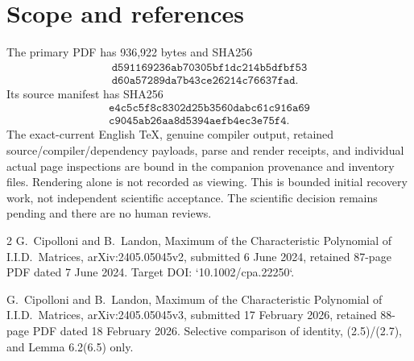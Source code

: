 \documentclass[10pt]{article}
\begin{document}
\section*{Scope and references}
The primary PDF has 936,922 bytes and SHA256 \[\begin{gathered}
\texttt{d591169236ab70305bf1dc214b5dfbf53}\\
\texttt{d60a57289da7b43ce26214c76637fad}.
\end{gathered}\] Its source manifest has SHA256 \[\begin{gathered}
\texttt{e4c5c5f8c8302d25b3560dabc61c916a69}\\
\texttt{c9045ab26aa8d5394aefb4ec3e75f4}.
\end{gathered}\] The exact-current English TeX, genuine compiler output, retained source/compiler/dependency payloads, parse and render receipts, and individual actual page inspections are bound in the companion provenance and inventory files. Rendering alone is not recorded as viewing. This is bounded initial recovery work, not independent scientific acceptance. The scientific decision remains pending and there are no human reviews.\par
2 G. Cipolloni and B. Landon, Maximum of the Characteristic Polynomial of I.I.D. Matrices, arXiv:2405.05045v2, submitted 6 June 2024, retained 87-page PDF dated 7 June 2024. Target DOI: `10.1002/cpa.22250`.\par
G. Cipolloni and B. Landon, Maximum of the Characteristic Polynomial of I.I.D. Matrices, arXiv:2405.05045v3, submitted 17 February 2026, retained 88-page PDF dated 18 February 2026. Selective comparison of identity, (2.5)/(2.7), and Lemma 6.2(6.5) only.\par
\end{document}
